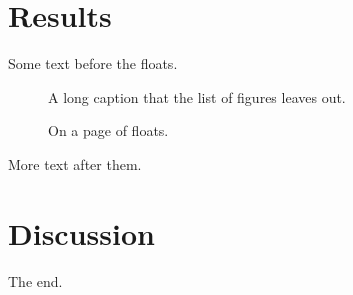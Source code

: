 \documentclass{article}
\begin{document}
\tableofcontents
\listoffigures
\listoftables
\section{Results}
Some text before the floats.
\begin{figure}[h]\centering\caption[Short title]{A long caption that the list of figures leaves out.}\end{figure}
\begin{table}[t]\centering\caption{Measurements, with a caption long enough to need more than a single line in the list of tables here.}\end{table}
\begin{figure}[p]\centering\caption{On a page of floats.}\end{figure}
More text after them.
\section{Discussion}
\begin{table}[b]\centering\caption{Last one.}\end{table}
The end.
\end{document}

